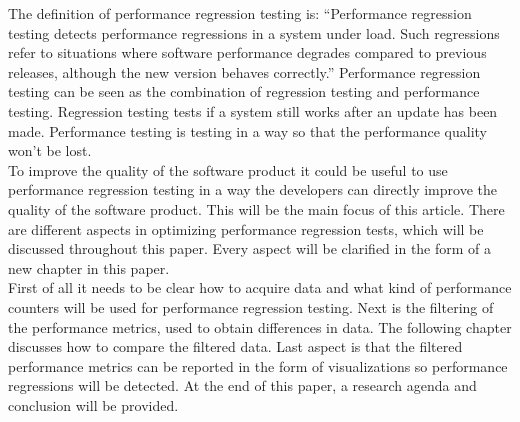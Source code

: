 The definition of performance regression testing is: ``Performance regression testing detects performance
regressions in a system under load. Such regressions refer to
situations where software performance degrades compared to
previous releases, although the new version behaves correctly.''\cite{foo2010mining}
Performance regression testing can be seen as the combination of regression testing and performance testing. Regression testing tests if a system still works after an update has been made. Performance testing is testing in a way so that the performance quality won't be lost. \\
To improve the quality of the software product it could be useful to use performance regression testing in a way the developers can
directly improve the quality of the software product. This will be the main focus of this article. There are different aspects in optimizing performance regression tests, which will be discussed throughout this paper. Every aspect will be clarified in the form of a new chapter in this paper. \\ First of all it needs to be clear how to acquire data and what kind of performance counters will be used for performance regression testing. Next is the filtering of the performance metrics, used to obtain differences in data. The following chapter discusses how to compare the filtered data. Last aspect is that the filtered performance metrics can be reported in the form of visualizations so performance regressions will be detected. At the end of this paper, a research agenda and conclusion will be provided.

